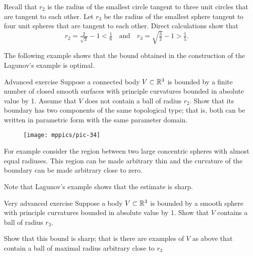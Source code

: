 Recall that $r_2$ is the radius of the smallest circle tangent to three unit circles that are tangent to each other.
Let $r_3$
be the radius of the smallest sphere tangent to four unit spheres that are tangent to each other.
Direct calculations show that 
\[r_2=\tfrac2{\sqrt{3}}-1< \tfrac16\quad\text{and}\quad r_3=\sqrt{\tfrac32}-1>\tfrac15.\]

The following example shows that the bound obtained in the construction of the Lagunov's example is optimal.


\begin{thm}{Advanced exercise}\label{ex:thin}
Suppose a connected body $V\subset \mathbb{R}^3$ is bounded by a finite number of closed smooth surfaces with principle curvatures bounded in absolute value by 1.
Assume that $V$ does not contain a ball of radius $r_2$.
Show that its boundary has two components of the same topological type; 
that is, both can be written in parametric form with the same parameter domain. 
\end{thm}

\begin{wrapfigure}{o}{33 mm}
\vskip-4mm
\centering
\texttt{[image: mppics/pic-34]}
\vskip0mm
\end{wrapfigure}

For example consider the region between two large concentric spheres with almost equal radiuses. 
This region can be made arbitrary thin and the curvature of the boundary can be made arbitrary close to zero.

Note that Lagunov's example shows that the estimate is sharp.


\begin{thm}{Very advanced exercise}\label{ex:PI-sphere}
Suppose a body $V\subset \mathbb{R}^3$ is bounded by a smooth sphere with principle curvatures bounded in absolute value by 1.
Show that $V$ contains a ball of radius $r_3$.

Show that this bound is sharp; that is there are examples of $V$ as above that contain a ball of maximal radius arbitrary close to $r_3$
\end{thm}




